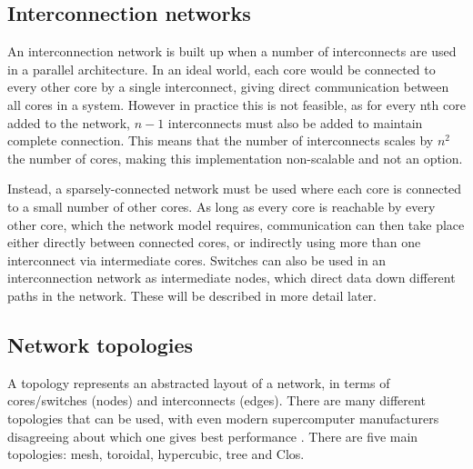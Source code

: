 \documentclass[a4paper, 12pt]{article}
\begin{document}
\subsection{Interconnection networks}

An interconnection network is built up when a number of interconnects are used in a parallel architecture. In an ideal world, each core would be connected to every other core by a single interconnect, giving direct communication between all cores in a system. However in practice this is not feasible, as for every nth core added to the network, $n-1$ interconnects must also be added to maintain complete connection. This means that the number of interconnects scales by $n^2$ the number of cores, making this implementation non-scalable and not an option.

Instead, a sparsely-connected network must be used where each core is connected to a small number of other cores. As long as every core is reachable by every other core, which the network model requires, communication can then take place either directly between connected cores, or indirectly using more than one interconnect via intermediate cores. Switches can also be used in an interconnection network as intermediate nodes, which direct data down different paths in the network. These will be described in more detail later.

\subsection{Network topologies}
\label{sec:topologies}

A topology represents an abstracted layout of a network, in terms of cores/switches (nodes) and interconnects (edges). There are many different topologies that can be used, with even modern supercomputer manufacturers disagreeing about which one gives best performance \cite{Han14}. There are five main topologies: mesh, toroidal, hypercubic, tree and Clos.
\end{document}
